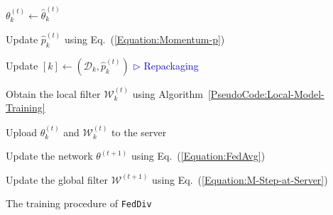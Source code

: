 \documentclass[letterpaper]{article} %
\begin{document}
\begin{algorithm}[t]
\begin{algorithmic}[1]
{{            \ENDFOR
            
            \STATE $\theta_{k}^{(t)} \leftarrow \hat{\theta}_{k}^{(t)}$\;
            
            \STATE Update $\hat{p}_{k}^{(t)}$ using Eq.~(\textcolor{red}{\ref{Equation:Momentum-p}})\;
            
            \STATE Update $[k] \leftarrow (\mathcal{D}_{k}, \hat{p}_{k}^{(t)})$ \hfill{\textcolor{blue}{$\triangleright$  Repackaging}}
            
            \STATE Obtain the local filter $\mathcal{W}_{k}^{(t)}$ using Algorithm~\textcolor{red}{\ref{PseudoCode:Local-Model-Training}}\;
            
            \STATE Upload $\theta_{k}^{(t)}$ and $\mathcal{W}_{k}^{(t)}$ to the server\;
            
        }\ENDFOR
        
        \STATE Update the network ${\theta}^{(t+1)}$ using Eq.~(\textcolor{red}{\ref{Equation:FedAvg}})\;
        
        \ENDFOR
        
        \STATE Update the global filter ${\mathcal{W}}^{(t+1)}$ using Eq.~(\textcolor{red}{\ref{Equation:M-Step-at-Server}})\;
        
        }\ENDFOR
        
    \end{algorithmic}
    \caption{The training procedure of \texttt{FedDiv}}
    \label{PseudoCode:FedDiv}
\end{algorithm}
    
\end{document}
